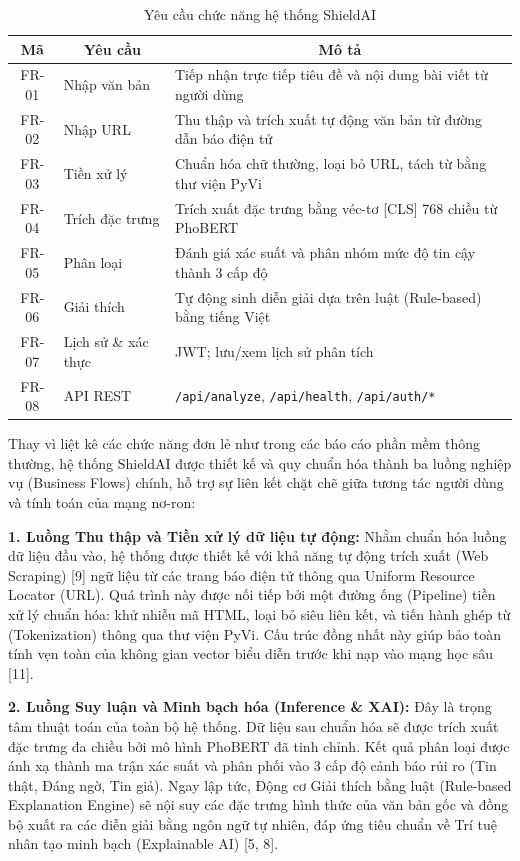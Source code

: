 \documentclass[12pt,a4paper]{article}
\begin{document}
\begin{table}[H]
\centering
\caption{Yêu cầu chức năng hệ thống ShieldAI}
\label{tab:yeu_cau_chuc_nang}
\begin{tabular}{|c|p{4cm}|p{8cm}|}
\hline
\textbf{Mã} & \multicolumn{1}{c|}{\textbf{Yêu cầu}} & \multicolumn{1}{c|}{\textbf{Mô tả}} \\
\hline
FR-01 & Nhập văn bản & Tiếp nhận trực tiếp tiêu đề và nội dung bài viết từ người dùng \\
\hline
FR-02 & Nhập URL & Thu thập và trích xuất tự động văn bản từ đường dẫn báo điện tử \\
\hline
FR-03 & Tiền xử lý & Chuẩn hóa chữ thường, loại bỏ URL, tách từ bằng thư viện PyVi \\
\hline
FR-04 & Trích đặc trưng & Trích xuất đặc trưng bằng véc-tơ [CLS] 768 chiều từ PhoBERT \\
\hline
FR-05 & Phân loại & Đánh giá xác suất và phân nhóm mức độ tin cậy thành 3 cấp độ \\
\hline
FR-06 & Giải thích & Tự động sinh diễn giải dựa trên luật (Rule-based) bằng tiếng Việt \\
\hline
FR-07 & Lịch sử \& xác thực & JWT; lưu/xem lịch sử phân tích \\
\hline
FR-08 & API REST & \texttt{/api/analyze}, \texttt{/api/health}, \texttt{/api/auth/*} \\
\hline
\end{tabular}
\end{table}

Thay vì liệt kê các chức năng đơn lẻ như trong các báo cáo phần mềm thông thường, hệ thống ShieldAI được thiết kế và quy chuẩn hóa thành ba luồng nghiệp vụ (Business Flows) chính, hỗ trợ sự liên kết chặt chẽ giữa tương tác người dùng và tính toán của mạng nơ-ron:

\textbf{1. Luồng Thu thập và Tiền xử lý dữ liệu tự động:} Nhằm chuẩn hóa luồng dữ liệu đầu vào, hệ thống được thiết kế với khả năng tự động trích xuất (Web Scraping) [9] ngữ liệu từ các trang báo điện tử thông qua Uniform Resource Locator (URL). Quá trình này được nối tiếp bởi một đường ống (Pipeline) tiền xử lý chuẩn hóa: khử nhiễu mã HTML, loại bỏ siêu liên kết, và tiến hành ghép từ (Tokenization) thông qua thư viện PyVi. Cấu trúc đồng nhất này giúp bảo toàn tính vẹn toàn của không gian vector biểu diễn trước khi nạp vào mạng học sâu [11].

\textbf{2. Luồng Suy luận và Minh bạch hóa (Inference \& XAI):} Đây là trọng tâm thuật toán của toàn bộ hệ thống. Dữ liệu sau chuẩn hóa sẽ được trích xuất đặc trưng đa chiều bởi mô hình PhoBERT đã tinh chỉnh. Kết quả phân loại được ánh xạ thành ma trận xác suất và phân phối vào 3 cấp độ cảnh báo rủi ro (Tin thật, Đáng ngờ, Tin giả). Ngay lập tức, Động cơ Giải thích bằng luật (Rule-based Explanation Engine) sẽ nội suy các đặc trưng hình thức của văn bản gốc và đồng bộ xuất ra các diễn giải bằng ngôn ngữ tự nhiên, đáp ứng tiêu chuẩn về Trí tuệ nhân tạo minh bạch (Explainable AI) [5, 8].
\end{document}
